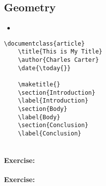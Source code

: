         \subsection{Geometry}
        \label{Geometry}
        
        \begin{framed}
            \begin{itemize}
                \item{}
            \end{itemize}
        \end{framed}


        \begin{verbatim}
\documentclass{article}
    \title{This is My Title}
    \author{Charles Carter}
    \date{\today{}}
 
    \maketitle{}
    \section{Introduction}
    \label{Introduction}
    \section{Body}
    \label{Body}
    \section{Conclusion}
    \label{Conclusion}
    
        \end{verbatim}

        \paragraph{Exercise:}

        \paragraph{Exercise:}


